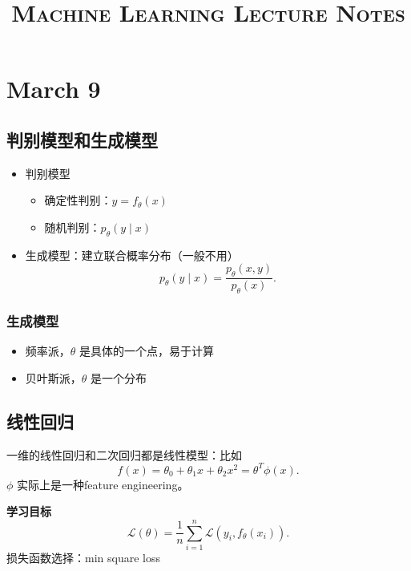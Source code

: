 
\linespread{1.5} \selectfont
\title{\textsc{Machine Learning Lecture Notes}}

\maketitle
\tableofcontents


\chapter{March 9}
\section{判别模型和生成模型}
\begin{itemize}
		\item 判别模型
				\begin{itemize}
						\item 确定性判别：$y=f_{\theta}\left( x \right) $
						\item 随机判别：$p_{\theta}\left( y \mid x \right) $
				\end{itemize}
		\item 生成模型：建立联合概率分布（一般不用）
				\[
						p_{\theta}\left( y \mid x \right) = \frac{p_{\theta}\left( x,y \right)}{p_{\theta}\left( x \right)  }
				.\] 
\end{itemize}

\subsection{生成模型}
\begin{itemize}
		\item 频率派，$\theta$ 是具体的一个点，易于计算
		\item 贝叶斯派，$\theta$ 是一个分布
\end{itemize}


\section{线性回归}
一维的线性回归和二次回归都是线性模型：比如
\[
		f\left( x \right) =\theta_0+\theta_1x+\theta_2 x^2 = \theta^{T} \phi\left( x \right) 
.\] 
$\phi$ 实际上是一种feature engineering。


\noindent \textbf{学习目标} 
\[
		\mathcal{L}\left( \theta \right)  = 
		\frac{1}{n} \sum_{i=1}^{n} \mathcal{L}\left( y_{i},f_{\theta}\left( x_{i} \right)  \right) 
.\] 
损失函数选择：min square loss

